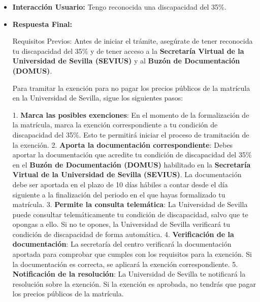 \documentclass{article}
\begin{document}
\begin{itemize}
\begin{itemize}
                        En resumen, para tramitar la exención para no pagar los precios públicos de la matrícula, es necesario que el estudiante:

                        1. Marque las posibles exenciones a las que pueda tener derecho en el momento de la formalización de la matrícula.
                        2. Aporte la documentación correspondiente en el Buzón de Documentación (DOMUS) habilitado en la Secretaría Virtual de la Universidad de Sevilla (SEVIUS) en el plazo establecido.
                        3. Permita la consulta telemática de la condición que alegue, salvo que se oponga a ello.

                        Es recomendable que el estudiante consulte con la secretaría del centro o con la Universidad de Sevilla para obtener más información sobre el procedimiento y los requisitos necesarios para tramitar la exención.
                  \item \textbf{Interacción Usuario:} Tengo reconocida una discapacidad del 35\%.
                  \item \textbf{Respuesta Final:}

                        Requisitos Previos:
                        Antes de iniciar el trámite, asegúrate de tener reconocida tu discapacidad del 35\% y de tener acceso a la \textbf{Secretaría Virtual de la Universidad de Sevilla (SEVIUS)} y al \textbf{Buzón de Documentación (DOMUS)}.

                        Para tramitar la exención para no pagar los precios públicos de la matrícula en la Universidad de Sevilla, sigue los siguientes pasos:

                        1. \textbf{Marca las posibles exenciones}: En el momento de la formalización de la matrícula, marca la exención correspondiente a tu condición de discapacidad del 35\%. Esto te permitirá iniciar el proceso de tramitación de la exención.
                        2. \textbf{Aporta la documentación correspondiente}: Debes aportar la documentación que acredite tu condición de discapacidad del 35\% en el \textbf{Buzón de Documentación (DOMUS)} habilitado en la \textbf{Secretaría Virtual de la Universidad de Sevilla (SEVIUS)}. La documentación debe ser aportada en el plazo de 10 días hábiles a contar desde el día siguiente a la finalización del periodo en el que hayas formalizado tu matrícula.
                        3. \textbf{Permite la consulta telemática}: La Universidad de Sevilla puede consultar telemáticamente tu condición de discapacidad, salvo que te opongas a ello. Si no te opones, la Universidad de Sevilla verificará tu condición de discapacidad de forma automática.
                        4. \textbf{Verificación de la documentación}: La secretaría del centro verificará la documentación aportada para comprobar que cumples con los requisitos para la exención. Si la documentación es correcta, se aplicará la exención correspondiente.
                        5. \textbf{Notificación de la resolución}: La Universidad de Sevilla te notificará la resolución sobre la exención. Si la exención es aprobada, no tendrás que pagar los precios públicos de la matrícula.


\end{itemize}
\end{itemize}
\end{document}
